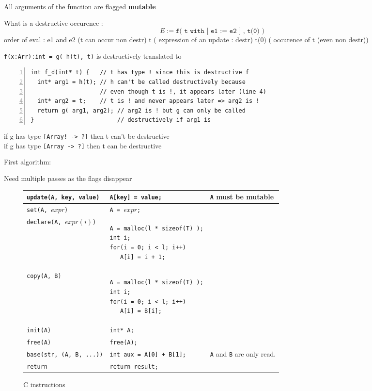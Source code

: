 \documentclass[12pt,a4paper,titlepage]{article}
\newcommand{\cl}[1]{\texttt{#1}}
\newcommand{\mut}{\textbf{mutable}}
\begin{document}
All arguments of the function are flagged \mut 




What is a destructive occurence :
$$ E :=  \cl{f(  t with [ e1 := e2 ] , t(0) )} $$
order of eval :
e1 and e2  (t can occur non destr)
t          ( expression of an update : destr)
t(0)       ( occurence of t (even non destr))

\cl{f(x:Arr):int = g( h(t), t)}  is destructively translated to \\
\begin{lstlisting}[numbers=left,caption=Example]
int f_d(int* t) {   // t has type ! since this is destructive f
  int* arg1 = h(t); // h can't be called destructively because
                    // even though t is !, it appears later (line 4)
  int* arg2 = t;    // t is ! and never appears later => arg2 is !
  return g( arg1, arg2); // arg2 is ! but g can only be called
}                        // destructively if arg1 is
\end{lstlisting}

if g has type \cl{[Array! -> ?]} then t can't be destructive\\

if g has type \cl{[Array -> ?]} then t can be destructive

First algorithm:


Need multiple passes as the flags disappear




\begin{figure}
\begin{tabular}{|p{50mm}|p{62mm}|p{45mm}|}
\hline
\cl{update(A, key, value)} & \cl{A[key] = value;} & \cl{A} must be \mut \\ \hline
\cl{set(A, $expr$)} & \cl{A = $expr$;} \\ \hline
\cl{declare(A, $expr(i)$)} & \begin{lstlisting}
A = malloc(l * sizeof(T) );
int i;
for(i = 0; i < l; i++)
   A[i] = i + 1;
\end{lstlisting} & \\ \hline
\cl{copy(A, B)} & \begin{lstlisting}
A = malloc(l * sizeof(T) );
int i;
for(i = 0; i < l; i++)
   A[i] = B[i];
\end{lstlisting} & \\ \hline
\cl{init(A)} & \cl{int* A;} & \\ \hline
\cl{free(A)} & \cl{free(A);} & \\ \hline
\cl{base(str, (A, B, ...))} & \cl{int aux = A[0] + B[1];} & \cl{A} and \cl{B} are only read. \\ \hline
\cl{return} & \cl{return result;} & \\ \hline
\end{tabular}
\caption{C instructions}
\end{figure}
\end{document}
